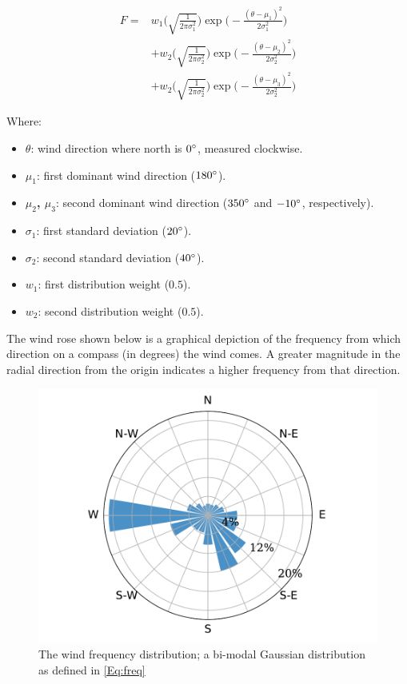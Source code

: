 \documentclass[]{aiaa-tc}
\begin{document}
\begin{align}
	F = & w_1\Bigg(\sqrt{\frac{1}{2 \pi \sigma_1^2}}\Bigg)\exp\Bigg(-\frac{(\theta-\mu_1)^2}{2 \sigma_1^2}\Bigg) \nonumber   \\
	    & + w_2\Bigg(\sqrt{\frac{1}{2 \pi \sigma_2^2}}\Bigg)\exp\Bigg(-\frac{(\theta-\mu_2)^2}{2 \sigma_2^2}\Bigg) \nonumber \\
	    & + w_2\Bigg(\sqrt{\frac{1}{2 \pi \sigma_2^2}}\Bigg)\exp\Bigg(-\frac{(\theta-\mu_3)^2}{2 \sigma_2^2}\Bigg)
	\label{Eq:freq}
\end{align}

Where:
\begin{itemize}
	\item \textbf{$\theta$}: wind direction where north is $0 \degree$, measured clockwise.
	\item \textbf{$\mu_1$}: first dominant wind direction ($180\degree$).
	\item \textbf{$\mu_2$, $\mu_3$}: second dominant wind direction ($350\degree$ and $-10\degree$, respectively).
	\item \textbf{$\sigma_1$}: first standard deviation ($20 \degree$).
	\item \textbf{$\sigma_2$}: second standard deviation ($40 \degree$).
	\item \textbf{$w_1$}: first distribution weight ($0.5$).
	\item \textbf{$w_2$}: second distribution weight ($0.5$).
\end{itemize}

The wind rose shown below is a graphical depiction of the frequency from which direction on a compass (in degrees) the wind comes. A greater magnitude in the radial direction from the origin indicates a higher frequency from that direction.
\begin{figure}[H]
    \centering \includegraphics[width=.5\textwidth]{windrose.pdf}
	\caption{The wind frequency distribution; a bi-modal Gaussian distribution as defined in \cref{Eq:freq}}
	\label{Fig:freq}
\end{figure}
\end{document}
